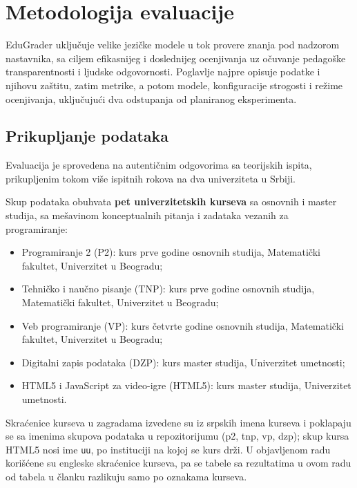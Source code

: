 \chapter{Metodologija evaluacije}
\label{sec:metodologija}

EduGrader uključuje velike jezičke modele u tok provere znanja pod nadzorom nastavnika,
sa ciljem efikasnijeg i doslednijeg ocenjivanja uz očuvanje pedagoške transparentnosti i ljudske odgovornosti.
Poglavlje najpre opisuje podatke i njihovu zaštitu, zatim metrike,
a potom modele, konfiguracije strogosti i režime ocenjivanja, uključujući dva odstupanja od planiranog eksperimenta.

\section{Prikupljanje podataka}
\label{sec:podaci}

Evaluacija je sprovedena na autentičnim odgovorima sa teorijskih ispita, prikupljenim tokom više ispitnih rokova na dva univerziteta u Srbiji.

Skup podataka obuhvata \textbf{pet univerzitetskih kurseva} sa osnovnih i master studija,
sa mešavinom konceptualnih pitanja i zadataka vezanih za programiranje:

\begin{itemize}
    \item Programiranje 2 (P2): kurs prve godine osnovnih studija, Matematički fakultet, Univerzitet u Beogradu;
    \item Tehničko i naučno pisanje (TNP): kurs prve godine osnovnih studija, Matematički fakultet, Univerzitet u Beogradu;
    \item Veb programiranje (VP): kurs četvrte godine osnovnih studija, Matematički fakultet, Univerzitet u Beogradu;
    \item Digitalni zapis podataka (DZP): kurs master studija, Univerzitet umetnosti;
    \item HTML5 i JavaScript za video-igre (HTML5): kurs master studija, Univerzitet umetnosti.
\end{itemize}
Skraćenice kurseva u zagradama izvedene su iz srpskih imena kurseva
i poklapaju se sa imenima skupova podataka u repozitorijumu (p2, tnp, vp, dzp);
skup kursa HTML5 nosi ime \texttt{uu}, po instituciji na kojoj se kurs drži.
U objavljenom radu~\cite{ikovic2025edugrader} korišćene su engleske skraćenice kurseva,
pa se tabele sa rezultatima u ovom radu od tabela u članku razlikuju samo po oznakama kurseva.

